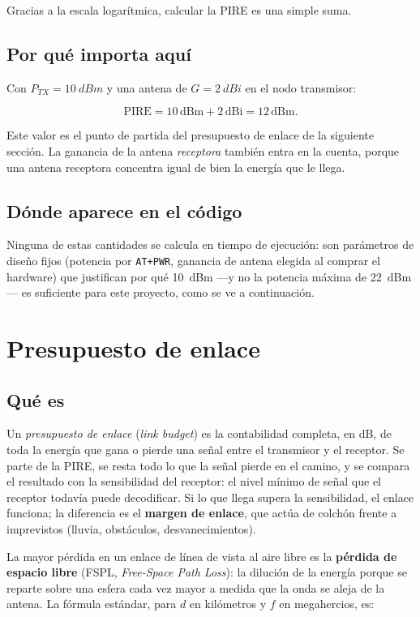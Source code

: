 Gracias a la escala logarítmica, calcular la PIRE es una simple suma.

\section{Por qué importa aquí}

Con $P_{TX} = \SI{10}{dBm}$ y una antena de $G = \SI{2}{dBi}$ en el nodo transmisor:

\[
  \text{PIRE} = 10\,\text{dBm} + 2\,\text{dBi} = 12\,\text{dBm}.
\]

Este valor es el punto de partida del presupuesto de enlace de la siguiente sección. La
ganancia de la antena \emph{receptora} también entra en la cuenta, porque una antena
receptora concentra igual de bien la energía que le llega.

\section{Dónde aparece en el código}

Ninguna de estas cantidades se calcula en tiempo de ejecución: son parámetros de diseño fijos
(potencia por \texttt{AT+PWR}, ganancia de antena elegida al comprar el hardware) que
justifican por qué \SI{10}{dBm} —y no la potencia máxima de \SI{22}{dBm}— es suficiente para
este proyecto, como se ve a continuación.

\chapter{Presupuesto de enlace}
\label{sec:presupuesto}

\section{Qué es}

Un \emph{presupuesto de enlace} (\emph{link budget}) es la contabilidad completa, en dB, de
toda la energía que gana o pierde una señal entre el transmisor y el receptor. Se parte de la
PIRE, se resta todo lo que la señal pierde en el camino, y se compara el resultado con la
sensibilidad del receptor: el nivel mínimo de señal que el receptor todavía puede decodificar.
Si lo que llega supera la sensibilidad, el enlace funciona; la diferencia es el
\textbf{margen de enlace}, que actúa de colchón frente a imprevistos (lluvia, obstáculos,
desvanecimientos).

La mayor pérdida en un enlace de línea de vista al aire libre es la \textbf{pérdida de espacio
libre} (FSPL, \emph{Free-Space Path Loss}): la dilución de la energía porque se reparte sobre
una esfera cada vez mayor a medida que la onda se aleja de la antena. La fórmula estándar,
para $d$ en kilómetros y $f$ en megahercios, es:

